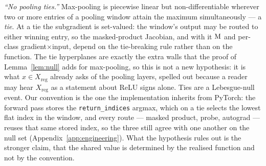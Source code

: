 \begin{clarifybox}
\emph{``No pooling ties.''} Max-pooling is piecewise linear but
non-differentiable wherever two or more entries of a pooling window attain the
maximum simultaneously --- a \emph{tie}. At a tie the subgradient is
set-valued: the window's output may be routed to either winning entry, so the
masked-product Jacobian, and with it $\mathrm{M}$ and per-class
gradient$\times$input, depend on the tie-breaking rule rather than on the
function. The tie hyperplanes are exactly the extra walls that the proof of
Lemma~\ref{lem:null} adds for max-pooling, so this is not a new hypothesis: it
is what $x\in X_{\mathrm{reg}}$ already asks of the pooling layers, spelled
out because a reader may hear $X_{\mathrm{reg}}$ as a statement about ReLU
signs alone. Ties are a Lebesgue-null event. Our convention is the one the
implementation inherits from PyTorch: the forward pass stores the
\texttt{return\_indices} argmax, which on a tie selects the lowest flat index
in the window, and every route --- masked product, probe, autograd --- reuses
that same stored index, so the three still agree with one another on the null
set (Appendix~\ref{app:engineering}). What the hypothesis rules out is the
stronger claim, that the shared value is determined by the realised function
and not by the convention.
\end{clarifybox}

